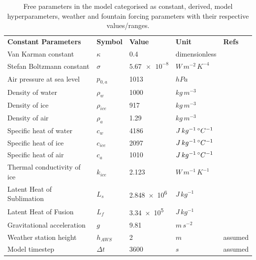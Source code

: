 \begin{table}
  \caption{Free parameters in the model categorised as constant, derived, model hyperparameters, weather and
  fountain forcing parameters with their respective values/ranges.}
	\label{tab:parameters}
	\begin{tabular}{lllll}
		\toprule
		\textbf{Constant Parameters}                       & \textbf{Symbol} & \textbf{Value} &
    \textbf{Unit} & \textbf{Refs} \\
    Van Karman constant & $\kappa$      & 0.4        &dimensionless & \cite{cuffeyPhysicsGlaciers2010}              \\
    Stefan Boltzmann constant & $\sigma$ & $\num{5.67 e-8} $& $W\, m^{-2}\, K^{-4}$ & \cite{cuffeyPhysicsGlaciers2010}\\
    Air pressure at sea level & $p_{0,a}$ & 1013 & $hPa$  & \cite{molgAblationAssociatedEnergy2004}\\
    Density of water & $\rho_{w}$ & 1000 & $kg\, m^{-3}$    & \cite{cuffeyPhysicsGlaciers2010}\\
    Density of ice & $\rho_{ice}$ & 917 & $kg\, m^{-3}$ & \cite{cuffeyPhysicsGlaciers2010}\\
    Density of air & $\rho_{a}$ &  1.29 & $kg\, m^{-3}$   & \cite{molgAblationAssociatedEnergy2004}\\
    Specific heat of water & $c_{w}$ & 4186 & $J\, kg^{-1}\,^{\circ} C^{-1}$  & \cite{cuffeyPhysicsGlaciers2010}\\
    Specific heat of ice & $c_{ice}$ & 2097 & $J\, kg^{-1}\,^{\circ} C^{-1}$ & \cite{cuffeyPhysicsGlaciers2010}\\
    Specific heat of air & $c_{a}$ & 1010 & $J\, kg^{-1}\,^{\circ} C^{-1}$ &
    \cite{molgAblationAssociatedEnergy2004}\\
    Thermal conductivity of ice & $k_{ice}$ & 2.123  & $W\, m^{-1}\, K^{-1}$ & \cite{bonalesThermalConductivityIce2017} \\
    Latent Heat of Sublimation & $L_{s}$ & \num{2.848e6}  & $J\, kg^{-1}$ &   \cite{cuffeyPhysicsGlaciers2010}\\
    Latent Heat of Fusion & $L_{f}$ & \num{3.34e5} & $J\, kg^{-1}$ & \cite{cuffeyPhysicsGlaciers2010}\\
    Gravitational acceleration & $g$ & 9.81 & $m\, s^{-2}$ &\cite{cuffeyPhysicsGlaciers2010}\\
    Weather station height & $h_{AWS}$ & 2 & $m$ & assumed \\
    Model timestep                            & $\Delta t$            & $3600$           & $s$ & assumed \\

\end{tabular}
\end{table}
